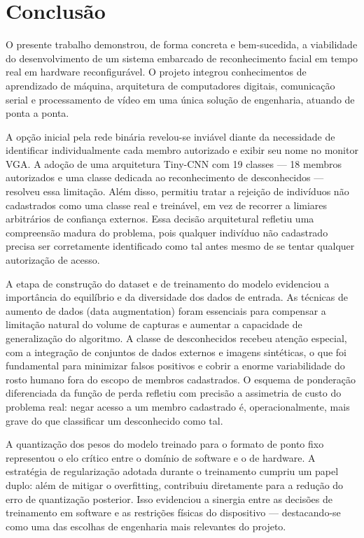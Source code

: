 \chapter{Conclusão}
O presente trabalho demonstrou, de forma concreta e bem-sucedida, a viabilidade do desenvolvimento de um sistema embarcado de reconhecimento facial em tempo real em hardware reconfigurável. O projeto integrou conhecimentos de aprendizado de máquina, arquitetura de computadores digitais, comunicação serial e processamento de vídeo em uma única solução de engenharia, atuando de ponta a ponta.

A opção inicial pela rede binária revelou-se inviável diante da necessidade de identificar individualmente cada membro autorizado e exibir seu nome no monitor VGA. A adoção de uma arquitetura Tiny-CNN com 19 classes — 18 membros autorizados e uma classe dedicada ao reconhecimento de desconhecidos — resolveu essa limitação. Além disso, permitiu tratar a rejeição de indivíduos não cadastrados como uma classe real e treinável, em vez de recorrer a limiares arbitrários de confiança externos. Essa decisão arquitetural refletiu uma compreensão madura do problema, pois qualquer indivíduo não cadastrado precisa ser corretamente identificado como tal antes mesmo de se tentar qualquer autorização de acesso.

A etapa de construção do dataset e de treinamento do modelo evidenciou a importância do equilíbrio e da diversidade dos dados de entrada. As técnicas de aumento de dados (data augmentation) foram essenciais para compensar a limitação natural do volume de capturas e aumentar a capacidade de generalização do algoritmo. A classe de desconhecidos recebeu atenção especial, com a integração de conjuntos de dados externos e imagens sintéticas, o que foi fundamental para minimizar falsos positivos e cobrir a enorme variabilidade do rosto humano fora do escopo de membros cadastrados. O esquema de ponderação diferenciada da função de perda refletiu com precisão a assimetria de custo do problema real: negar acesso a um membro cadastrado é, operacionalmente, mais grave do que classificar um desconhecido como tal.

A quantização dos pesos do modelo treinado para o formato de ponto fixo representou o elo crítico entre o domínio de software e o de hardware. A estratégia de regularização adotada durante o treinamento cumpriu um papel duplo: além de mitigar o overfitting, contribuiu diretamente para a redução do erro de quantização posterior. Isso evidenciou a sinergia entre as decisões de treinamento em software e as restrições físicas do dispositivo — destacando-se como uma das escolhas de engenharia mais relevantes do projeto.

